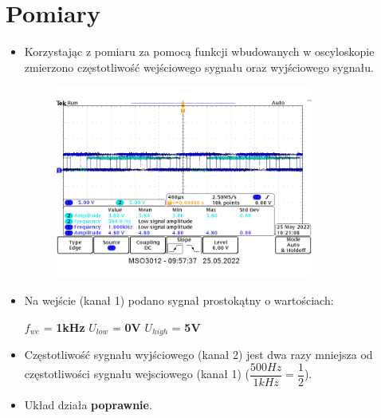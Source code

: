 \pagebreak

\section{Pomiary}

\begin{itemize}
    \item Korzystając z pomiaru za pomocą funkcji wbudowanych w oscyloskopie zmierzono częstotliwość wejściowego sygnału oraz wyjściowego sygnału.
        \begin{figure}[H]
            \centering
            \includegraphics[width=0.8\textwidth]{img/dzielenie/polowa_okresu.png}
            \label{JK_dzielenie:wskazanie oscyloskopu}
        \end{figure}
    \item Na wejście (kanał 1) podano sygnał prostokątny o wartościach:
        \begin{center}
            $f_{we}$ = \textbf{1kHz}
            $U_{low}$ = \textbf{0V}
            $U_{high}$ = \textbf{5V}
        \end{center}
    \item Częstotliwość sygnału wyjściowego (kanał 2) jest dwa razy mniejsza od częstotliwości sygnału wejsciowego (kanał 1) ($\dfrac{500Hz}{1kHz}=\dfrac{1}{2}$).
    \item Układ działa \textbf{poprawnie}.
\end{itemize}